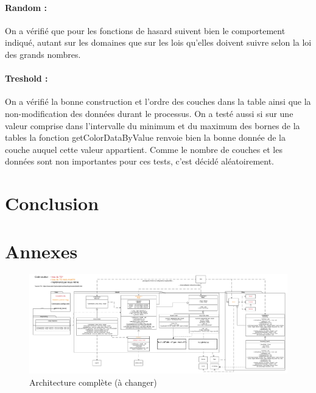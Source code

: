 \documentclass[a4paper]{article}
\begin{document}
\paragraph{Random : } On a vérifié que pour les fonctions de hasard suivent bien le comportement indiqué, autant sur les domaines que sur les lois qu'elles doivent suivre selon la loi des grands nombres.

\paragraph{Treshold : } On a vérifié la bonne construction et l'ordre des couches dans la table ainsi que la non-modification des données durant le processus. 
On a testé aussi si sur une valeur comprise dans l'intervalle du minimum et du maximum des bornes de la tables la fonction getColorDataByValue renvoie bien la bonne donnée de la couche auquel cette valeur appartient.
Comme le nombre de couches et les données sont non importantes pour ces tests, c'est décidé aléatoirement.

\section{Conclusion}

\section{Annexes}

\begin{figure}[!h]
    \begin{center}
        \includegraphics[width=1.5\linewidth, angle=90]{img/Architecture_complete.png} 
        \caption{Architecture complète (à changer)}
        \label{archiComplete}
    \end{center}
\end{figure}

\newpage


\end{document}
